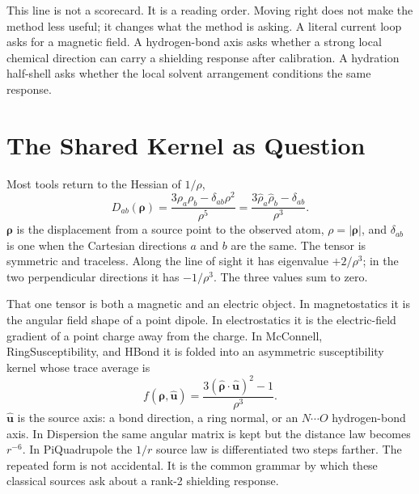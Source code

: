 \documentclass[11pt]{article}
\begin{document}
\begin{center}
\end{center}

This line is not a scorecard. It is a reading order. Moving right does not make
the method less useful; it changes what the method is asking. A literal current
loop asks for a magnetic field. A hydrogen-bond axis asks whether a strong local
chemical direction can carry a shielding response after calibration. A
hydration half-shell asks whether the local solvent arrangement conditions the
same response.

\section{The Shared Kernel as Question}

Most tools return to the Hessian of \(1/\rho\),
\[
  D_{ab}(\bm\rho)
  =
  \frac{3\rho_a\rho_b-\delta_{ab}\rho^2}{\rho^5}
  =
  \frac{3\hat\rho_a\hat\rho_b-\delta_{ab}}{\rho^3}.
\]
\(\bm\rho\) is the displacement from a source point to the observed atom,
\(\rho=|\bm\rho|\), and \(\delta_{ab}\) is one when the Cartesian directions
\(a\) and \(b\) are the same. The tensor is symmetric and traceless. Along the
line of sight it has eigenvalue \(+2/\rho^3\); in the two perpendicular
directions it has \(-1/\rho^3\). The three values sum to zero.

That one tensor is both a magnetic and an electric object. In magnetostatics it
is the angular field shape of a point dipole. In electrostatics it is the
electric-field gradient of a point charge away from the charge. In McConnell,
RingSusceptibility, and HBond it is folded into an asymmetric susceptibility
kernel whose trace average is
\[
  f(\bm\rho,\hat{\bm u})
  =
  \frac{3(\hat{\bm\rho}\cdot\hat{\bm u})^2-1}{\rho^3}.
\]
\(\hat{\bm u}\) is the source axis: a bond direction, a ring normal, or an
\(N\cdots O\) hydrogen-bond axis. In Dispersion the same angular matrix is kept
but the distance law becomes \(r^{-6}\). In PiQuadrupole the \(1/r\) source law
is differentiated two steps farther. The repeated form is not accidental. It is
the common grammar by which these classical sources ask about a rank-2
shielding response.
\end{document}
